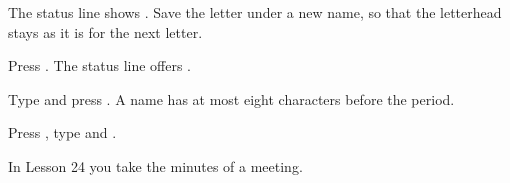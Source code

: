 The status line shows .  Save the letter under a new
name, so that the letterhead stays as it is for the next letter.
\begin{WPSteps}
\item Press .  The status line offers .
\item Type  and press .  A name has at
most eight characters before the period.
\item Press , type  and .
\end{WPSteps}
\EndReplay
In Lesson 24 you take the minutes of a meeting.
